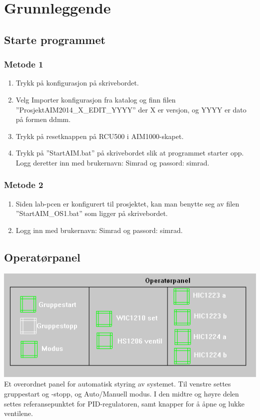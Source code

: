 \section{Grunnleggende}
\subsection{Starte programmet}
\subsubsection*{Metode 1}
\begin{enumerate}
	\item Trykk på konfigurasjon på skrivebordet.
  \item Velg Importer konfigurasjon fra katalog og finn filen ''ProsjektAIM2014\_X\_EDIT\_YYYY'' der X er versjon, og YYYY er dato på formen ddmm.
  \item Trykk på resetknappen på RCU500 i AIM1000-skapet.
	\item Trykk på ''StartAIM.bat'' på skrivebordet slik at programmet starter opp. Logg deretter inn med brukernavn: Simrad og passord: simrad. 
\end{enumerate}

\subsubsection*{Metode 2}
\begin{enumerate}
  \item Siden lab-pcen er konfigurert til prosjektet, kan man benytte seg av filen ''StartAIM\_OS1.bat'' som ligger på skrivebordet.
  \item Logg inn med brukernavn: Simrad og passord: simrad.
\end{enumerate}

\subsection{Operatørpanel}
\includegraphics[]{operatorpanel.png} \\
Et overordnet panel for automatisk styring av systemet. Til venstre settes gruppestart og -stopp, og Auto/Manuell modus. I den midtre og høyre delen settes referansepunktet for PID-regulatoren, samt knapper for å åpne og lukke ventilene.
 

